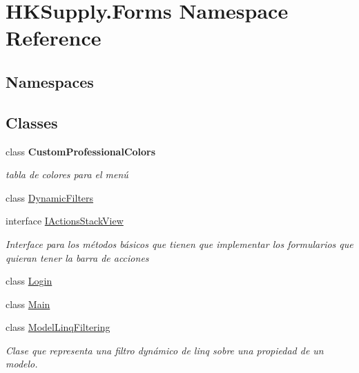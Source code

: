 \hypertarget{namespace_h_k_supply_1_1_forms}{}\section{H\+K\+Supply.\+Forms Namespace Reference}
\label{namespace_h_k_supply_1_1_forms}
\subsection*{Namespaces}
\begin{DoxyCompactItemize}
\end{DoxyCompactItemize}
\subsection*{Classes}
\begin{DoxyCompactItemize}
\item 
class {\bfseries Custom\+Professional\+Colors}
\begin{DoxyCompactList}\small\item\em tabla de colores para el menú \end{DoxyCompactList}\item 
class \hyperlink{class_h_k_supply_1_1_forms_1_1_dynamic_filters}{Dynamic\+Filters}
\item 
interface \hyperlink{interface_h_k_supply_1_1_forms_1_1_i_actions_stack_view}{I\+Actions\+Stack\+View}
\begin{DoxyCompactList}\small\item\em Interface para los métodos básicos que tienen que implementar los formularios que quieran tener la barra de acciones \end{DoxyCompactList}\item 
class \hyperlink{class_h_k_supply_1_1_forms_1_1_login}{Login}
\item 
class \hyperlink{class_h_k_supply_1_1_forms_1_1_main}{Main}
\item 
class \hyperlink{class_h_k_supply_1_1_forms_1_1_model_linq_filtering}{Model\+Linq\+Filtering}
\begin{DoxyCompactList}\small\item\em Clase que representa una filtro dynámico de linq sobre una propiedad de un modelo. \end{DoxyCompactList}\end{DoxyCompactItemize}
